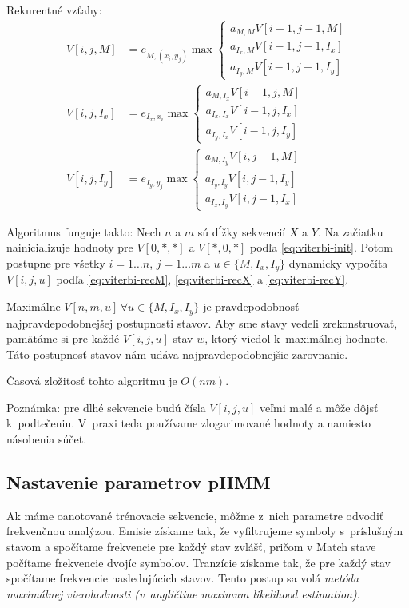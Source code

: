 Rekurentné vzťahy:
\begin{align}
\label{eq:viterbi-recM}
V[i,j,M] &= e_{M, (x_i, y_j)} \max \left\{
\begin{array}{l}
a_{M,M} V[i-1,j-1,M]\\
a_{I_x,M} V[i-1,j-1,I_x]\\
a_{I_y,M} V[i-1,j-1, I_y]
\end{array} \right.\\
\label{eq:viterbi-recX}
V[i,j, I_x] &= e_{I_x, x_i}\max \left\{
\begin{array}{l}
a_{M, I_x} V[i-1,j,M]\\
a_{I_x, I_x} V[i-1,j,I_x]\\
a_{I_y, I_x} V[i-1,j,I_y]
\end{array} \right.\\
\label{eq:viterbi-recY}
V[i,j, I_y] &= e_{I_y, y_j}\max \left\{
\begin{array}{l}
a_{M, I_y} V[i,j-1,M]\\
a_{I_y, I_y} V[i,j-1,I_y]\\
a_{I_x, I_y} V[i,j-1,I_x]
\end{array} \right.
\end{align}

Algoritmus funguje takto:
Nech $n$ a $m$ sú dĺžky sekvencií $X$ a $Y$.
Na začiatku nainicializuje hodnoty pre $V[0,*,*]$ a $V[*,0,*]$ podľa \ref{eq:viterbi-init}.
Potom postupne pre všetky $i = 1\dots n$, $j = 1\dots m$ a $u \in \{M, I_x, I_y\}$ dynamicky vypočíta $V[i, j, u]$ podľa \ref{eq:viterbi-recM}, \ref{eq:viterbi-recX} a \ref{eq:viterbi-recY}.

Maximálne $V[n, m, u]\, \forall u \in \{M, I_x, I_y\}$ je pravdepodobnosť najpravdepodobnejšej postupnosti stavov.
Aby sme stavy vedeli zrekonstruovať, pamätáme si pre každé $V[i, j, u]$ stav $w$, ktorý viedol k~maximálnej hodnote. Táto postupnosť stavov nám udáva najpravdepodobnejšie zarovnanie.

Časová zložitosť tohto algoritmu je $O(nm)$.

Poznámka: pre dlhé sekvencie budú čísla $V[i, j, u]$ veľmi malé a môže dôjsť k~podtečeniu. V~praxi teda používame zlogarimované hodnoty a namiesto násobenia súčet.
\cite{durbin}

\subsection{Nastavenie parametrov pHMM}
\label{subsec:hmmtraining}
Ak máme oanotované trénovacie sekvencie, môžme z~nich parametre odvodiť frekvenčnou analýzou. Emisie získame tak, že vyfiltrujeme symboly s~príslušným stavom a spočítame frekvencie pre každý stav zvlášť, pričom v Match stave počítame frekvencie dvojíc symbolov. Tranzície získame tak, že pre každý stav spočítame frekvencie nasledujúcich stavov. Tento postup sa volá \textit{metóda maximálnej vierohodnosti (v~angličtine maximum likelihood estimation)}. \cite{ durbin, wiki:mle}

